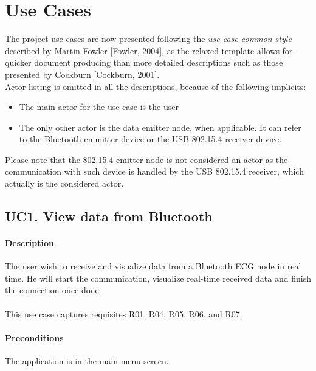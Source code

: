 	\section{Use Cases}
	\label{sec:sw-ucases}

		The project use cases are now presented following the \emph{use case common style} described by Martin Fowler [Fowler, 2004], as the relaxed template allows for quicker document producing than more detailed descriptions such as those presented by Cockburn [Cockburn, 2001].\\

		Actor listing is omitted in all the descriptions, because of the following implicits:
		\begin{itemize}
			\item The main actor for the use case is the user
			\item The only other actor is the data emitter node, when applicable. It can refer to the Bluetooth emmitter device or the USB 802.15.4 receiver device.
		\end{itemize}
		Please note that the 802.15.4 emitter node is not considered an actor as the communication with such device is handled by the USB 802.15.4 receiver, which actually is the considered actor.

		\subsection{UC1. View data from Bluetooth}

			\paragraph{Description} The user wish to receive and visualize data from a Bluetooth ECG node in real time. He will start the communication, visualize real-time received data and finish the connection once done.\\
			\\This use case captures requisites R01, R04, R05, R06, and R07.

			\paragraph{Preconditions} The application is in the main menu screen.
